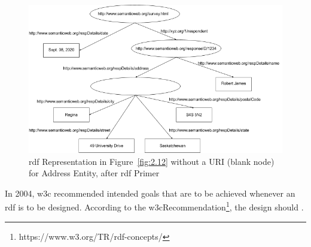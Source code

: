 \begin{doublespace}
\begin{figure}[htp]
    \centering
    \includegraphics[width=15cm]{images/ch2/Figure13.png}
    \caption{\ac{rdf} Representation in Figure~\ref{fig:2.12} without a URI (blank node) for Address Entity, after \ac{rdf} Primer~\cite{manola2004rdf}}
    \label{fig:2.13}
\end{figure}
\par In 2004, \ac{w3c} recommended intended goals that are to be achieved whenever an \ac{rdf} is to be designed. According to the \ac{w3c}Recommendation\footnote{https://www.w3.org/TR/rdf-concepts/}, the design should .

\end{doublespace}
